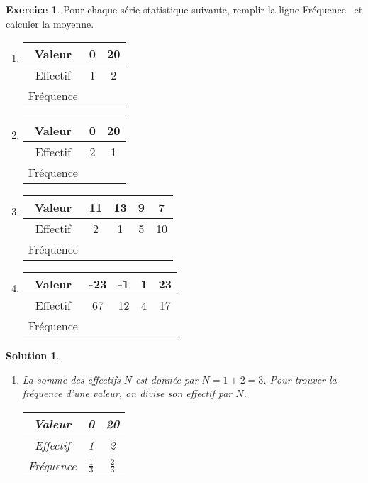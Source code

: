 \documentclass[a4paper, 14pt]{extarticle}
\theoremstyle{plain}
\newtheorem*{sol}{Solution}
\theoremstyle{definition}
\newtheorem{ex}{Exercice}
\newcommand{\exe}[2]{
		\begin{ex} #1  \end{ex}
		\begin{sol} #2 \end{sol}
	}
\newcommand{\exe}[2]{
		\begin{ex} #1  \end{ex}
	}
\begin{document}
\exe{
	Pour chaque série statistique suivante, remplir la ligne \og Fréquence \fg \, et calculer la moyenne.
		\begin{multicols}{2}
		\begin{enumerate}
			\item 
				\begin{tabular}{|c|c|c|}\hline
				Valeur   & 0 & 20 \\ \hline
				Effectif & 1 & 2  \\ \hline
				Fréquence & &  \\ \hline
				\end{tabular}
				
			\item 
				\begin{tabular}{|c|c|c|}\hline
				Valeur   & 0 & 20 \\ \hline
				Effectif & 2 & 1  \\ \hline
				Fréquence & &  \\ \hline
				\end{tabular}
				
			\item 
				\begin{tabular}{|c|c|c|c|c|}\hline
				Valeur   & 11 & 13 & 9 & 7 \\ \hline
				Effectif & 2 & 1 & 5 & 10 \\ \hline
				Fréquence & &&&  \\ \hline
				\end{tabular}
				
			\item 
				\begin{tabular}{|c|c|c|c|c|}\hline
				Valeur   & -23 & -1 & 1 & 23 \\ \hline
				Effectif & 67 & 12 & 4 & 17 \\ \hline
				Fréquence & &&&  \\ \hline
				\end{tabular}

		\end{enumerate}
		\end{multicols}
}{
		\begin{enumerate}
			\item 
				La somme des effectifs $N$ est donnée par $N = 1+2 = 3$.
				Pour trouver la fréquence d'une valeur, on divise son effectif par $N$.
				
				\begin{tabular}{|c|c|c|}\hline
				Valeur   & 0 & 20 \\ \hline
				Effectif & 1 & 2  \\ \hline
				Fréquence & $\frac13$ & $\frac23$  \\ \hline
				\end{tabular}
				

\end{enumerate}}
\end{document}
